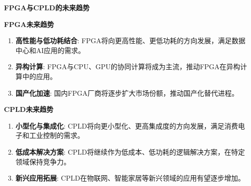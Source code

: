 \documentclass[
  ignorenonframetext,
  chinese,
]{beamer}
\providecommand{\tightlist}{%
  \setlength{\itemsep}{0pt}\setlength{\parskip}{0pt}}
\begin{document}
\begin{frame}{\textbf{FPGA与CPLD的未来趋势}}
\label{fpgaux4e0ecpldux7684ux672aux6765ux8d8bux52bf}
\begin{block}{\textbf{FPGA未来趋势}}
\label{fpgaux672aux6765ux8d8bux52bf}
\begin{enumerate}
\tightlist
\item
  \textbf{高性能与低功耗结合}:
  FPGA将向更高性能、更低功耗的方向发展，满足数据中心和AI应用的需求。\\
\item
  \textbf{异构计算}:
  FPGA与CPU、GPU的协同计算将成为主流，推动FPGA在异构计算中的应用。\\
\item
  \textbf{国产化加速}:
  国内FPGA厂商将逐步扩大市场份额，推动国产化替代进程。
\end{enumerate}
\end{block}

\begin{block}{\textbf{CPLD未来趋势}}
\label{cpldux672aux6765ux8d8bux52bf}
\begin{enumerate}
\tightlist
\item
  \textbf{小型化与集成化}:
  CPLD将向更小型化、更高集成度的方向发展，满足消费电子和工业控制的需求。\\
\item
  \textbf{低成本解决方案}:
  CPLD将继续作为低成本、低功耗的逻辑解决方案，在特定领域保持竞争力。\\
\item
  \textbf{新兴应用拓展}:
  CPLD在物联网、智能家居等新兴领域的应用有望逐步增加。
\end{enumerate}
\end{block}
\end{frame}
\end{document}
